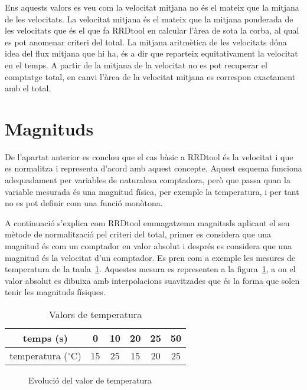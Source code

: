 Ens aquests valors es veu com la velocitat mitjana no és el mateix que la mitjana de les velocitats. La velocitat mitjana és el mateix que la mitjana ponderada de les velocitats que és el que fa RRDtool en calcular l'àrea de sota la corba, al qual es pot anomenar criteri del total.
La mitjana aritmètica de les velocitats dóna idea del flux mitjana que hi ha, és a dir que reparteix equitativament la velocitat en el temps. A partir de la mitjana de la velocitat no es pot recuperar el comptatge total, en canvi l'àrea de la velocitat mitjana es correspon exactament amb el total.



\section{Magnituds}

De l'apartat anterior es conclou que el cas bàsic a RRDtool és la velocitat i que es normalitza i representa d'acord amb aquest concepte. Aquest esquema funciona adequadament per variables de naturalesa comptadora, però que passa quan la variable mesurada és una magnitud física, per exemple la temperatura, i per tant no es pot definir com una funció monòtona.

A continuació s'explica com RRDtool emmagatzema magnituds aplicant el seu mètode de normalització pel criteri del total, primer es considera que una magnitud és com un comptador en valor absolut i després es considera que una magnitud és la velocitat d'un comptador.
Es pren com a exemple les mesures de temperatura de la taula~\ref{tab:velocitats:temperatura}. Aquestes mesura es representen a la figura~\ref{fig:velocitats:temperatura}, a on el valor absolut es dibuixa amb interpolacions suavitzades que és la forma que solen tenir les magnituds físiques. 

\begin{table}[tbp]
\centering
\begin{tabular}{c|ccccc}
  temps (s) &  0 & 10 & 20 &25  & 50 \\ \hline
temperatura ($^\circ$C)& 15 & 25 & 15 & 20 & 25 
\end{tabular}
\caption{Valors de temperatura}
\label{tab:velocitats:temperatura}
\end{table}

\begin{figure}[tbp]
  \centering
  \caption{Evolució del valor de temperatura}
  \label{fig:velocitats:temperatura}
\end{figure}

